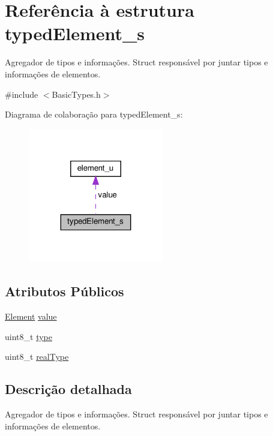 \hypertarget{structtypedElement__s}{}\section{Referência à estrutura typed\+Element\+\_\+s}
\label{structtypedElement__s}


Agregador de tipos e informações. Struct responsável por juntar tipos e informações de elementos.  




{\ttfamily \#include $<$Basic\+Types.\+h$>$}



Diagrama de colaboração para typed\+Element\+\_\+s\+:
\nopagebreak
\begin{figure}[H]
\begin{center}
\leavevmode
\includegraphics[width=167pt]{structtypedElement__s__coll__graph}
\end{center}
\end{figure}
\subsection*{Atributos Públicos}
\begin{DoxyCompactItemize}
\item 
\hyperlink{BasicTypes_8h_a8132f4f0515064141e31e606660df561}{Element} \hyperlink{structtypedElement__s_a31beb2ade81f8acacfc312bba3ab2086}{value}
\item 
uint8\+\_\+t \hyperlink{structtypedElement__s_a725ddec1b2a04b6488cdde81f3e0255e}{type}
\item 
uint8\+\_\+t \hyperlink{structtypedElement__s_a265d7ad822f91bfa8fd6eb292e2d20d8}{real\+Type}
\end{DoxyCompactItemize}


\subsection{Descrição detalhada}
Agregador de tipos e informações. Struct responsável por juntar tipos e informações de elementos. 

